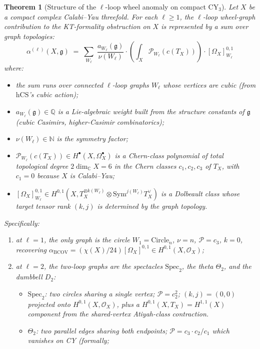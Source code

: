 \documentclass[11pt]{article}
\newtheorem{theorem}{Theorem}[section]
\providecommand{\CY}{\mathrm{CY}}
\providecommand{\BCOV}{\mathrm{BCOV}}
\providecommand{\hCS}{\mathrm{hCS}}
\providecommand{\Om}{\Omega}
\providecommand{\Sym}{\mathrm{Sym}}
\providecommand{\cO}{\mathcal{O}}
\providecommand{\fg}{\mathfrak{g}}
\providecommand{\CC}{\mathbb{C}}
\providecommand{\QQ}{\mathbb{Q}}
\providecommand{\NN}{\mathbb{N}}
\begin{document}
\begin{theorem}[Structure of the $\ell$-loop wheel anomaly on compact $\CY_3$]
\label{thm:ell-loop-structure}
\ClaimStatusTheorem
Let $X$ be a compact complex Calabi--Yau threefold.  For each
$\ell \geq 1$, the $\ell$-loop wheel-graph contribution to the
KT-formality obstruction on $X$ is represented by a sum over graph
topologies:
\[
  \alpha^{(\ell)}(X, \fg) \;=\;
  \sum_{W_\ell} \; \frac{a_{W_\ell}(\fg)}{\nu(W_\ell)}
    \cdot \left(\int_X \mathcal P_{W_\ell}(c(T_X))\right)
    \cdot [\Om_X]^{0,1}_{W_\ell}
\]
where:
\begin{itemize}
\item the sum runs over connected $\ell$-loop graphs $W_\ell$ whose
vertices are cubic (from $\hCS$'s cubic action);
\item $a_{W_\ell}(\fg) \in \QQ$ is a Lie-algebraic weight built from
the structure constants of $\fg$ (cubic Casimirs, higher-Casimir
combinatorics);
\item $\nu(W_\ell) \in \NN$ is the symmetry factor;
\item $\mathcal P_{W_\ell}(c(T_X)) \in H^\bullet(X, \Om^\bullet_X)$
is a Chern-class polynomial of total topological degree $2 \dim_\CC
X = 6$ in the Chern classes $c_1, c_2, c_3$ of $T_X$, with
$c_1 = 0$ because $X$ is Calabi--Yau;
\item $[\Om_X]^{0,1}_{W_\ell} \in H^{0,1}(X, T_X^{\otimes k(W_\ell)}
\otimes \Sym^{j(W_\ell)} T_X^\vee)$ is a Dolbeault class whose
target tensor rank $(k, j)$ is determined by the graph topology.
\end{itemize}
Specifically:
\begin{enumerate}[label=\textup{(\arabic*)}]
\item at $\ell = 1$, the only graph is the circle $W_1 =
\mathrm{Circle}_n$, $\nu = n$, $\mathcal P = c_3$, $k = 0$,
recovering $\alpha_\BCOV = (\chi(X)/24) [\Om_X]^{0,1} \in
H^{0,1}(X, \cO_X)$;
\item at $\ell = 2$, the two-loop graphs are the spectacles
$\mathrm{Spec}_2$, the theta $\Theta_2$, and the dumbbell
$D_2$:
\begin{itemize}
\item $\mathrm{Spec}_2$: two circles sharing a single vertex;
$\mathcal P = c_2^2$; $(k, j) = (0, 0)$ projected onto $H^{0,1}(X, \cO_X)$, plus a
$H^{0,1}(X, T_X) = H^{1,1}(X)$ component from the shared-vertex
Atiyah-class contraction.
\item $\Theta_2$: two parallel edges sharing both endpoints;
$\mathcal P = c_3 \cdot c_2 / c_1$ which vanishes on CY (formally;

\end{itemize}
\end{enumerate}
\end{theorem}
\end{document}
